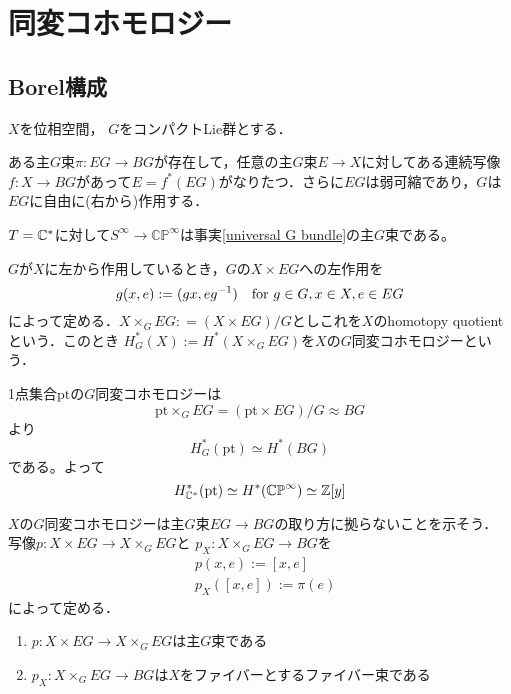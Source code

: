 \section{同変コホモロジー}
\subsection{Borel構成}

$X$を位相空間， $G$をコンパクトLie群とする．

\begin{fact}\label{universal G bundle}
  ある主$G$束$\pi\colon EG\rightarrow BG$が存在して，任意の主$G$束$E\rightarrow X$に対してある連続写像$f\colon X\rightarrow BG$があって$E=f^*(EG)$がなりたつ．さらに$EG$は弱可縮であり，$G$は$EG$に自由に(右から)作用する．
\end{fact}

\begin{eg}
  $T=\mathbb{C}^*$に対して$S^\infty\rightarrow \mathbb{CP}^\infty$は事実\ref{universal G bundle}の主$G$束である。
\end{eg}

\begin{defin}
  $G$が$X$に左から作用しているとき，$G$の$X\times EG$への左作用を
  \[
  g(x, e) := (gx, eg^{-1}) \quad \text{for } g\in G, x\in X, e\in EG 
  \]
  によって定める．$X\times_GEG\colon=(X\times EG)/G$としこれを$X$のhomotopy quotient という．このとき
  $H^*_G(X):=H^*(X\times_GEG)$を$X$の$G$同変コホモロジーという．
\end{defin}

\begin{eg}
  1点集合$\text{pt}$の$G$同変コホモロジーは
  \[
  \text{pt}\times_GEG=(\text{pt}\times EG)/G\approx BG
  \]
  より
  \[
  H^*_G(\text{pt})\simeq H^*(BG)
  \]
  である。よって
  \[
  H^*_{\mathbb{C}^*}(\text{pt})\simeq H^*(\mathbb{CP}^\infty)\simeq \mathbb{Z}[y]
  \]
\end{eg}


$X$の$G$同変コホモロジーは主$G$束$EG\rightarrow BG$の取り方に拠らないことを示そう．
写像$p\colon X\times EG\rightarrow X\times_GEG$と $p_X\colon X\times_GEG\rightarrow BG$を
\begin{align*}
  &p(x, e):=[x, e]\\
  &p_X([x, e]):=\pi(e)
\end{align*}
によって定める．

\begin{prop}
  \:
  \begin{enumerate}
    \item $p\colon X\times EG\rightarrow X\times_GEG$は主$G$束である
    \item $p_X\colon X\times_GEG\rightarrow BG$は$X$をファイバーとするファイバー束である
  \end{enumerate}
\end{prop}

